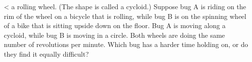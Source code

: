 <%
a rolling wheel. (The shape is called a cycloid.) Suppose
bug A is riding on the rim of the wheel on a bicycle that is
rolling, while bug B is on the spinning wheel of a bike
that is sitting upside down on the floor. Bug A is moving
along a cycloid, while bug B is moving in a circle. Both
wheels are doing the same number of revolutions per minute.
Which bug has a harder time holding on, or do they find
it equally difficult?
